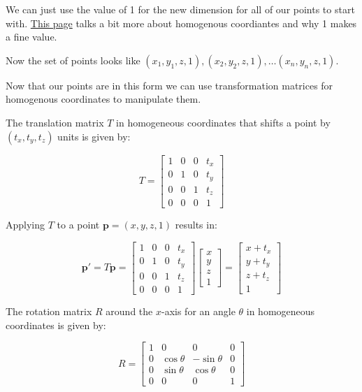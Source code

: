 \documentclass{article}
\begin{document}
We can just use the value of 1 for the new dimension for all of our points to start with. \href{https://www.tomdalling.com/blog/modern-opengl/explaining-homogenous-coordinates-and-projective-geometry/}{This page} talks a bit more about homogenous coordiantes and why 1 makes a fine value.

Now the set of points looks like ${(x_1, y_1, z, 1), (x_2, y_2, z, 1), \dots (x_n, y_n, z, 1)}.$

Now that our points are in this form we can use transformation matrices for homogenous coordinates to manipulate them.

The translation matrix $T$ in homogeneous coordinates that shifts a point by $(t_x, t_y, t_z)$ units is given by:

\[ T = \begin{bmatrix}
1 & 0 & 0 & t_x \\
0 & 1 & 0 & t_y \\
0 & 0 & 1 & t_z \\
0 & 0 & 0 & 1
\end{bmatrix} \]

Applying $T$ to a point $\mathbf{p} = (x, y, z, 1)$ results in:

\[ \mathbf{p'} = T \mathbf{p} = \begin{bmatrix}
1 & 0 & 0 & t_x \\
0 & 1 & 0 & t_y \\
0 & 0 & 1 & t_z \\
0 & 0 & 0 & 1
\end{bmatrix} \begin{bmatrix}
x \\
y \\
z \\
1
\end{bmatrix} = \begin{bmatrix}
x + t_x \\
y + t_y \\
z + t_z \\
1
\end{bmatrix} \]

The rotation matrix $R$ around the $x$-axis for an angle $\theta$ in homogeneous coordinates is given by:

\[ R = \begin{bmatrix}
1 & 0 & 0 & 0 \\
0 & \cos \theta & -\sin \theta & 0 \\
0 & \sin \theta & \cos \theta & 0 \\
0 & 0 & 0 & 1
\end{bmatrix} \]
\end{document}
